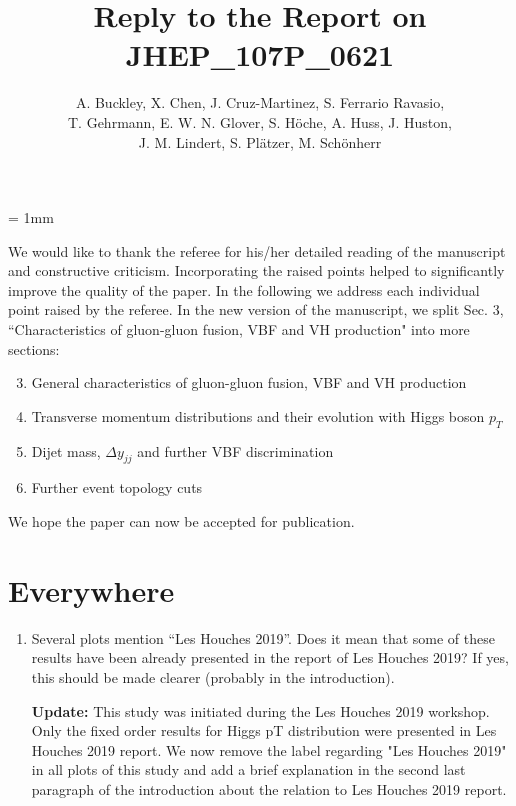 \documentclass[12pt]{article}
\begin{document}
\unitlength = 1mm
\title{Reply to the Report on JHEP\_107P\_0621}
\author{A. Buckley, X. Chen, J. Cruz-Martinez, S. Ferrario Ravasio,\\ T. Gehrmann, E. W. N. Glover, S. H{\"o}che, A. Huss, J. Huston,\\ J. M. Lindert, S. Pl{\"a}tzer, M. Sch{\"o}nherr}
\date{}
\maketitle

We would like to thank the referee for his/her detailed reading of the manuscript and constructive criticism. Incorporating the raised points helped to significantly improve the quality of the paper.
In the following we address each individual point raised by the referee.
In the new version of the manuscript, we split Sec. 3, ``Characteristics of gluon-gluon fusion,  VBF and VH production" into more sections:
\begin{enumerate}
  \setcounter{enumi}{2}
\item General characteristics of gluon-gluon fusion,  VBF and VH production
\item Transverse momentum distributions and their evolution with Higgs boson $p_T$
\item Dijet mass, $\Delta y_{jj}$ and further VBF discrimination
\item Further event topology cuts
\end{enumerate}
 We hope the paper can now be accepted for publication.

\section*{Everywhere}
\begin{enumerate}
	\item Several plots mention “Les Houches 2019”. Does it mean that some of these results have been already presented in the report of Les Houches 2019? If yes, this should be made clearer (probably in the introduction).

{\bf Update:} This study was initiated during the Les Houches 2019 workshop. Only the fixed order results for Higgs pT distribution were presented in Les Houches 2019 report. We now remove the label regarding "Les Houches 2019" in all plots of this study and add a brief explanation in the second last paragraph of the introduction about the relation to Les Houches 2019 report. 
\end{enumerate}
\end{document}
